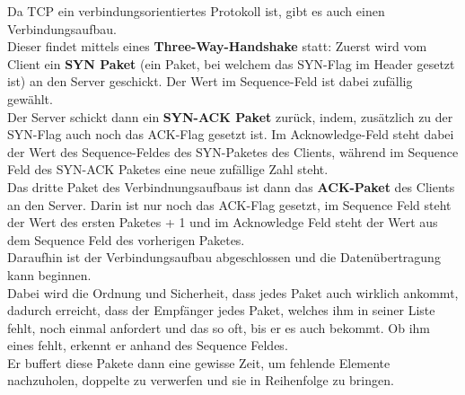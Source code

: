 \documentclass[12pt,a4paper]{report}
\begin{document}
Da TCP ein verbindungsorientiertes Protokoll ist, gibt es auch einen Verbindungsaufbau.\\
Dieser findet mittels eines \textbf{Three-Way-Handshake} statt: Zuerst wird vom Client ein \textbf{SYN Paket} (ein Paket, bei welchem das SYN-Flag im Header gesetzt ist) an den Server geschickt. Der Wert im Sequence-Feld ist dabei zufällig gewählt.\\
Der Server schickt dann ein \textbf{SYN-ACK Paket} zurück, indem, zusätzlich zu der SYN-Flag auch noch das ACK-Flag gesetzt ist. Im Acknowledge-Feld steht dabei der Wert des Sequence-Feldes des SYN-Paketes des Clients, während im Sequence Feld des SYN-ACK Paketes eine neue zufällige Zahl steht.\\
Das dritte Paket des Verbindnungsaufbaus ist dann das \textbf{ACK-Paket} des Clients an den Server. Darin ist nur noch das ACK-Flag gesetzt, im Sequence Feld steht der Wert des ersten Paketes + 1 und im Acknowledge Feld steht der Wert aus dem Sequence Feld des vorherigen Paketes.\\

Daraufhin ist der Verbindungsaufbau abgeschlossen und die Datenübertragung kann beginnen.\\
Dabei wird die Ordnung und Sicherheit, dass jedes Paket auch wirklich ankommt, dadurch erreicht, dass der Empfänger jedes Paket, welches ihm in seiner Liste fehlt, noch einmal anfordert und das so oft, bis er es auch bekommt. Ob ihm eines fehlt, erkennt er anhand des Sequence Feldes.\\
Er buffert diese Pakete dann eine gewisse Zeit, um fehlende Elemente nachzuholen, doppelte zu verwerfen und sie in Reihenfolge zu bringen.\\
\end{document}
